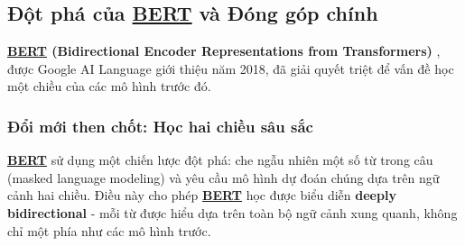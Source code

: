 \subsection{Đột phá của \hyperref[acro:bert]{\textbf{BERT}} và Đóng góp chính}
\label{ssec:muc_tieu_dong_gop_bert}

\textbf{\hyperref[acro:bert]{\textbf{BERT}} (Bidirectional Encoder Representations from Transformers)} \cite{devlin2018bert}, được Google AI Language giới thiệu năm 2018, đã giải quyết triệt để vấn đề học một chiều của các mô hình trước đó. 

\subsubsection{Đổi mới then chốt: Học hai chiều sâu sắc}
\hyperref[acro:bert]{\textbf{BERT}} sử dụng một chiến lược đột phá: che ngẫu nhiên một số từ trong câu (masked language modeling) và yêu cầu mô hình dự đoán chúng dựa trên ngữ cảnh hai chiều. Điều này cho phép \hyperref[acro:bert]{\textbf{BERT}} học được biểu diễn \textbf{deeply bidirectional} - mỗi từ được hiểu dựa trên toàn bộ ngữ cảnh xung quanh, không chỉ một phía như các mô hình trước.

